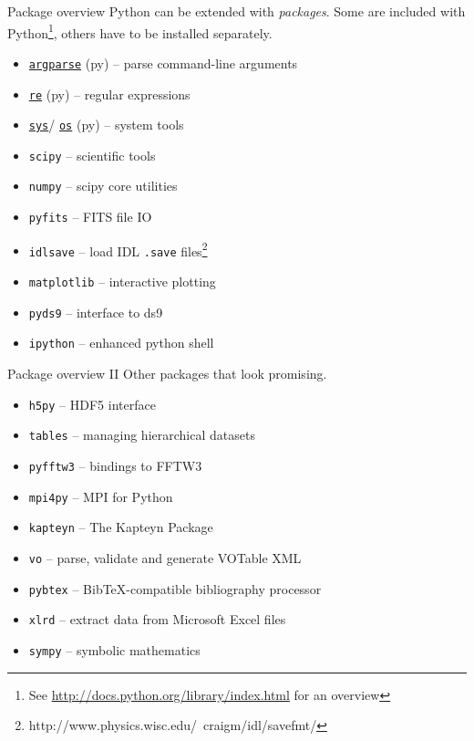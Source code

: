 \documentclass[xetex,10pt]{beamer}
\def\spacer{\vspace*{1em}}
\begin{document}
\begin{frame}[fragile]{Package overview}
	Python can be extended with \emph{packages}. Some are included with Python\footnote[frame]{See \url{http://docs.python.org/library/index.html} for an overview}, others have to be installed separately.
	\spacer
	\begin{itemize}
		\item \href{http://docs.python.org/library/argparse.html}{\texttt{argparse}} (py) -- parse command-line arguments
		\item \href{http://docs.python.org/library/re.html}{\texttt{re}} (py) -- regular expressions
		\item \href{http://docs.python.org/library/sys.html}{\texttt{sys}}/%
		\href{http://docs.python.org/library/os.html}{\texttt{os}} (py) -- system tools
		\pause
		\item \texttt{scipy} -- scientific tools
		\item \texttt{numpy} -- scipy core utilities
		\pause
		\item \texttt{pyfits} -- FITS file IO
		\item \texttt{idlsave} -- load IDL \texttt{.save} files\footnote[frame]{http://www.physics.wisc.edu/~craigm/idl/savefmt/}
		\pause
		\item \texttt{matplotlib} -- interactive plotting
		\item \texttt{pyds9} -- interface to ds9
		\pause
		\item \texttt{ipython} -- enhanced python shell
	\end{itemize}
\end{frame}

\begin{frame}[fragile]{Package overview II}
	Other packages that look promising.
	\spacer
	\begin{itemize}
		\item \texttt{h5py} -- HDF5 interface
		\item \texttt{tables} -- managing hierarchical datasets
		\pause
		\item \texttt{pyfftw3} -- bindings to FFTW3
		\item \texttt{mpi4py} -- MPI for Python
		\pause
		\item \texttt{kapteyn} -- The Kapteyn Package
		\item \texttt{vo} -- parse, validate and generate VOTable XML
		\pause
		\item \texttt{pybtex} -- BibTeX-compatible bibliography processor
		\item \texttt{xlrd} -- extract data from Microsoft Excel files
		\item \texttt{sympy} -- symbolic mathematics
	\end{itemize}
\end{frame}
\end{document}
